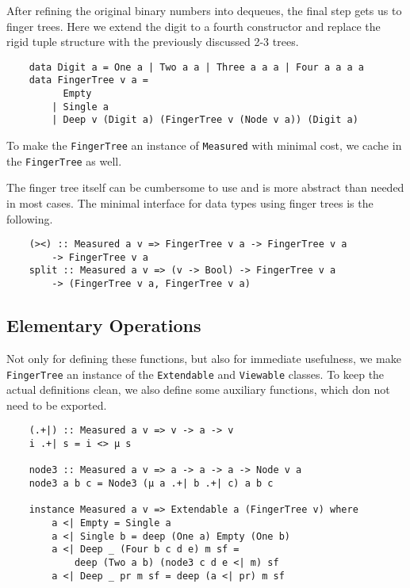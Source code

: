After refining the original binary numbers into dequeues, the final step gets us to finger trees. Here we extend the digit to a fourth constructor and replace the rigid tuple structure with the previously discussed 2-3 trees.

\begin{verbatim}
    data Digit a = One a | Two a a | Three a a a | Four a a a a
    data FingerTree v a =
          Empty
        | Single a
        | Deep v (Digit a) (FingerTree v (Node v a)) (Digit a)
\end{verbatim}

To make the \texttt{FingerTree} an instance of \texttt{Measured} with minimal cost, we cache in the \texttt{FingerTree} as well.\par
The finger tree itself can be cumbersome to use and is more abstract than needed in most cases. The minimal interface for data types using finger trees is the following.

\begin{verbatim}
    (><) :: Measured a v => FingerTree v a -> FingerTree v a
        -> FingerTree v a
    split :: Measured a v => (v -> Bool) -> FingerTree v a
        -> (FingerTree v a, FingerTree v a)
\end{verbatim}

\subsection{Elementary Operations}

Not only for defining these functions, but also for immediate usefulness, we make \texttt{FingerTree} an instance of the \texttt{Extendable} and \texttt{Viewable} classes. To keep the actual definitions clean, we also define some auxiliary functions, which don not need to be exported.

\begin{verbatim}
    (.+|) :: Measured a v => v -> a -> v
    i .+| s = i <> μ s

    node3 :: Measured a v => a -> a -> a -> Node v a
    node3 a b c = Node3 (μ a .+| b .+| c) a b c

    instance Measured a v => Extendable a (FingerTree v) where
        a <| Empty = Single a
        a <| Single b = deep (One a) Empty (One b)
        a <| Deep _ (Four b c d e) m sf =
            deep (Two a b) (node3 c d e <| m) sf
        a <| Deep _ pr m sf = deep (a <| pr) m sf
\end{verbatim}

